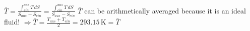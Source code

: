 \( \bar{T} = \frac{\int_{ein}^{aus} T \, dS}{S_{aus} - S_{ein}} = \frac{\int_{ein}^{aus} T \, dS}{S_{aus} - S_{ein}} \)  
\( \bar{T} \) can be arithmetically averaged because it is an ideal fluid!  
\( \Rightarrow \bar{T} = \frac{T_{aus} + T_{ein}}{2} = 293.15 \, \text{K} = \bar{T} \)